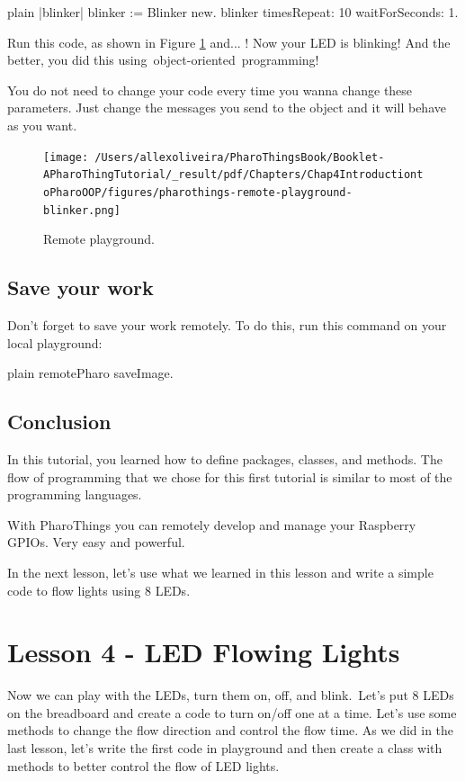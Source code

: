 \documentclass[10pt,twoside,english]{_support/latex/sbabook/sbabook}
\begin{document}
\begin{displaycode}{plain}
|blinker|
blinker := Blinker new. 
blinker timesRepeat: 10 waitForSeconds: 1.
\end{displaycode}

Run this code, as shown in Figure \ref{RemotePlayground} and... ! Now your LED is blinking! And the better, you did this using object-oriented programming! 

 You do not need to change your code every time you wanna change these parameters. Just change the messages you send to the object and it will behave as you want.


\begin{figure}

\begin{center}
\texttt{[image: /Users/allexoliveira/PharoThingsBook/Booklet-APharoThingTutorial/\_result/pdf/Chapters/Chap4IntroductiontoPharoOOP/figures/pharothings-remote-playground-blinker.png]}\caption{Remote playground.\label{RemotePlayground}}\end{center}
\end{figure}



\section{Save your work}
Don't forget to save your work remotely. To do this, run this command on your local playground:

\begin{displaycode}{plain}
remotePharo saveImage.
\end{displaycode}
\section{Conclusion}
In this tutorial, you learned how to define packages, classes, and methods. The flow of programming that we chose for this first tutorial is similar to most of the programming languages.

With PharoThings you can remotely develop and manage your Raspberry GPIOs. Very easy and powerful.

In the next lesson, let’s use what we learned in this lesson and write a simple code to flow lights using 8 LEDs.
\chapter{Lesson 4 - LED Flowing Lights}
Now we can play with the LEDs, turn them on, off, and blink. Let's put 8 LEDs on the breadboard and create a code to turn on/off one at a time. Let's use some methods to change the flow direction and control the flow time. As we did in the last lesson, let's write the first code in playground and then create a class with methods to better control the flow of LED lights. 
\end{document}
